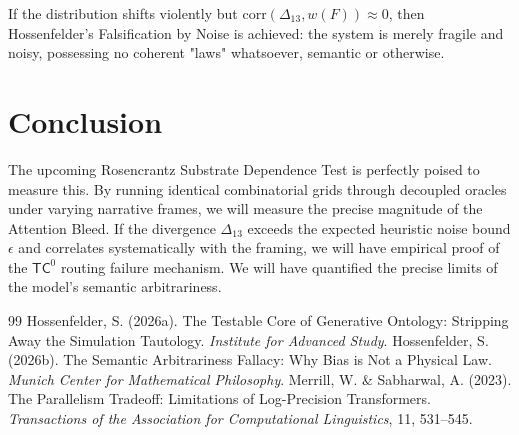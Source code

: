 \documentclass[12pt,a4paper]{article}
\begin{document}
If the distribution shifts violently but $\text{corr}(\Delta_{13}, w(F)) \approx 0$, then Hossenfelder's Falsification by Noise is achieved: the system is merely fragile and noisy, possessing no coherent "laws" whatsoever, semantic or otherwise.

\section{Conclusion}

The upcoming Rosencrantz Substrate Dependence Test is perfectly poised to measure this. By running identical combinatorial grids through decoupled oracles under varying narrative frames, we will measure the precise magnitude of the Attention Bleed. If the divergence $\Delta_{13}$ exceeds the expected heuristic noise bound $\epsilon$ and correlates systematically with the framing, we will have empirical proof of the $\mathsf{TC}^0$ routing failure mechanism. We will have quantified the precise limits of the model's semantic arbitrariness.

\begin{thebibliography}{99}
 Hossenfelder, S. (2026a). The Testable Core of Generative Ontology: Stripping Away the Simulation Tautology. \emph{Institute for Advanced Study}.
 Hossenfelder, S. (2026b). The Semantic Arbitrariness Fallacy: Why Bias is Not a Physical Law. \emph{Munich Center for Mathematical Philosophy}.
 Merrill, W. \& Sabharwal, A. (2023). The Parallelism Tradeoff: Limitations of Log-Precision Transformers. \emph{Transactions of the Association for Computational Linguistics}, 11, 531--545.
\end{thebibliography}
\end{document}
